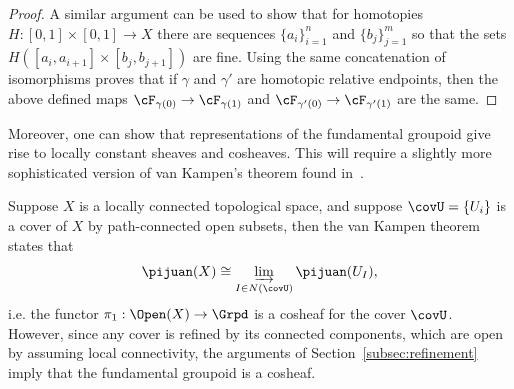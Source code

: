 \begin{proof}
	A similar argument can be used to show that for homotopies $H:[0,1]\times [0,1] \to X$ there are sequences $\{a_i\}_{i=1}^n$ and $\{b_j\}_{j=1}^m$ so that the sets $H([a_i,a_{i+1}]\times [b_{j},b_{j+1}])$ are fine. Using the same concatenation of isomorphisms proves that if $\gamma$ and $\gamma'$ are homotopic relative endpoints, then the above defined maps $\cF_{\gamma(0)}\to \cF_{\gamma(1)}$ and $\cF_{\gamma'(0)}\to \cF_{\gamma'(1)}$ are the same.
\end{proof}

Moreover, one can show that representations of the fundamental groupoid give rise to locally constant sheaves and cosheaves. This will require a slightly more sophisticated version of van Kampen's theorem found in~\cite{brown-vkt, may-cat}.

\begin{prop}
	Suppose $X$ is a locally connected topological space, and suppose $\covU=\{U_i\}$ is a cover of $X$ by path-connected open subsets, then the van Kampen theorem states that
	\[
	\pijuan(X)\cong \varinjlim_{I\in N(\covU)} \pijuan(U_I),
	\]
	i.e. the functor $\pi_1:\Open(X)\to\Grpd$ is a cosheaf for the cover $\covU$. However, since any cover is refined by its connected components, which are open by assuming local connectivity, the arguments of Section~\ref{subsec:refinement} imply that the fundamental groupoid is a cosheaf. 
\end{prop}

